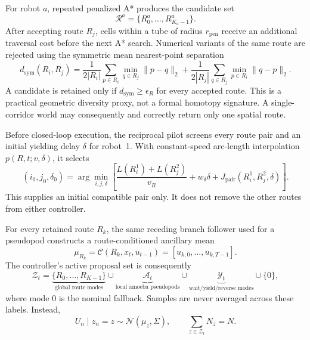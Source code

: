 \documentclass[11pt,a4paper]{article}
\begin{document}
For robot $a$, repeated penalized A* produces the candidate set
\begin{equation}
  \mathcal R^a=\{R^a_0,\ldots,R^a_{K_a-1}\}.
\end{equation}
After accepting route $R_j$, cells within a tube of radius $r_{\mathrm{pen}}$
receive an additional traversal cost before the next A* search. Numerical
variants of the same route are rejected using the symmetric mean nearest-point
separation
\begin{equation}
 d_{\mathrm{sym}}(R_i,R_j)
 =\frac{1}{2|R_i|}\sum_{p\in R_i}\min_{q\in R_j}\|p-q\|_2
 +\frac{1}{2|R_j|}\sum_{q\in R_j}\min_{p\in R_i}\|q-p\|_2.
 \label{eq:global-route-separation}
\end{equation}
A candidate is retained only if $d_{\mathrm{sym}}\ge\epsilon_R$ for every
accepted route. This is a practical geometric diversity proxy, not a formal
homotopy signature. A single-corridor world may consequently and correctly
return only one spatial route.

Before closed-loop execution, the reciprocal pilot screens every route pair
and an initial yielding delay $\delta$ for robot~1. With constant-speed
arc-length interpolation $p(R,t;v,\delta)$, it selects
\begin{equation}
 (i_0,j_0,\delta_0)
 =\arg\min_{i,j,\delta}
 \left[
   \frac{L(R^1_i)+L(R^2_j)}{v_R}
   +w_\delta\delta
   +J_{\mathrm{pair}}(R^1_i,R^2_j,\delta)
 \right].
 \label{eq:initial-route-pair}
\end{equation}
This supplies an initial compatible pair only. It does not remove the other
routes from either controller.

For every retained route $R_k$, the same receding branch follower used for a
pseudopod constructs a route-conditioned ancillary mean
\begin{equation}
  \mu_{R_k}=\mathcal C(R_k,x_t,u_{t-1})
  =[u_{k,0},\ldots,u_{k,T-1}].
\end{equation}
The controller's active proposal set is consequently
\begin{equation}
 \mathcal Z_t=
 \underbrace{\{R_0,\ldots,R_{K-1}\}}_{\text{global route modes}}
 \cup
 \underbrace{\mathcal A_t}_{\text{local amoeba pseudopods}}
 \cup
 \underbrace{\mathcal Y_t}_{\text{wait/yield/reverse modes}}
 \cup\{0\},
 \label{eq:parallel-topology-set}
\end{equation}
where mode $0$ is the nominal fallback. Samples are never averaged across
these labels. Instead,
\begin{equation}
 U_n\mid z_n=z\sim\mathcal N(\mu_z,\Sigma),
 \qquad \sum_{z\in\mathcal Z_t}N_z=N.
 \label{eq:parallel-topology-mixture}
\end{equation}
\end{document}
